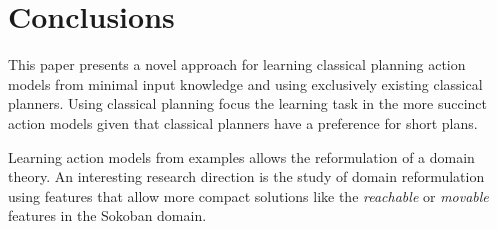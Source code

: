 \documentclass[letterpaper]{article} %
\begin{document}
\section{Conclusions}
This paper presents a novel approach for learning classical planning action models from minimal input knowledge and using exclusively existing classical planners. Using classical planning focus the learning task in the more succinct action models given that classical planners have a preference for short plans.

Learning action models from examples allows the reformulation of a domain theory. An interesting research direction is the study of domain reformulation using features that allow more compact solutions like the {\em reachable} or {\em movable} features in the Sokoban domain.



\end{document}
